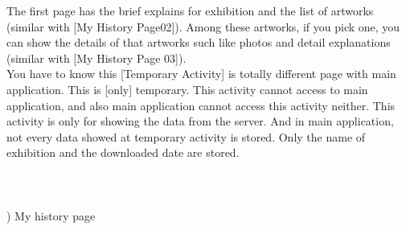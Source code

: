 \documentclass[conference]{IEEEtran}
\begin{document}
The first page has the brief explains for exhibition and the list of artworks (similar with [My History Page02]). Among these artworks, if you pick one, you can show the details of that artworks such like photos and detail explanations (similar with [My History Page 03]).\\

You have to know this [Temporary Activity] is totally different page with main application. This is [only] temporary. This activity cannot access to main application, and also main application cannot access this activity neither. This activity is only for showing the data from the server. And in main application, not every data showed at temporary activity is stored. Only the name of exhibition and the downloaded date are stored. \\\\\\\\

) My history page\\
\end{document}
